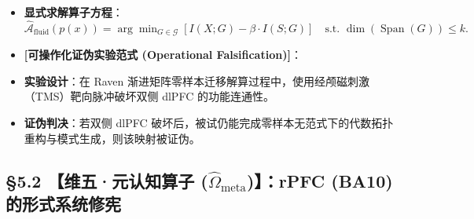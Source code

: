 \documentclass[11pt,a4paper,oneside]{ctexart}
\begin{document}
\begin{itemize}\item \textbf{显式求解算子方程}：$\hat{\mathcal{A}}_{\text{fluid}}(p(x)) = \arg\min_{G \in \mathcal{G}} \left[ I(X; G) - \beta \cdot I(S; G) \right] \quad \text{s.t. } \operatorname{dim}(\operatorname{Span}(G)) \le k.$\end{itemize}
\begin{itemize}\item \textbf{[可操作化证伪实验范式 (Operational Falsification)]}：\end{itemize}
\begin{itemize}\item \textbf{实验设计}：在 Raven 渐进矩阵零样本迁移解算过程中，使用经颅磁刺激（TMS）靶向脉冲破坏双侧 dlPFC 的功能连通性。\end{itemize}
\begin{itemize}\item \textbf{证伪判决}：若双侧 dlPFC 破坏后，被试仍能完成零样本无范式下的代数拓扑重构与模式生成，则该映射被证伪。\end{itemize}

\subsection{§5.2 【维五·元认知算子 (\texorpdfstring{$\hat{\Omega}_{\text{meta}}$}{Omega\_meta})】：rPFC (BA10) 的形式系统修宪}
\end{document}
